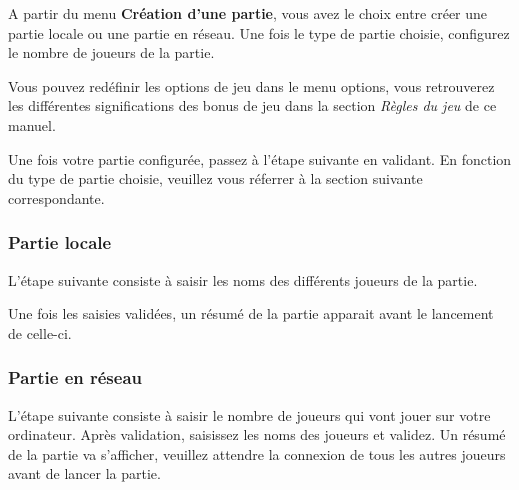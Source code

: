 	A partir du menu \textbf{Création d'une partie}, vous avez le choix entre créer une partie locale ou une partie en réseau.
Une fois le type de partie choisie, configurez le nombre de joueurs de la partie. 


Vous pouvez redéfinir les options de jeu dans le menu options, vous retrouverez les différentes significations des bonus de jeu dans la section \textit{Règles du jeu} de ce manuel.


Une fois votre partie configurée, passez à l'étape suivante en validant. En fonction du type de partie choisie, veuillez vous réferrer à la section suivante correspondante.

	\subsubsection{Partie locale}
		L'étape suivante consiste à saisir les noms des différents joueurs de la partie. 
		
		Une fois les saisies validées, un résumé de la partie apparait avant le lancement de celle-ci.
		
	\subsubsection{Partie en réseau}
		L'étape suivante consiste à saisir le nombre de joueurs qui vont jouer sur votre ordinateur.
		Après validation, saisissez les noms des joueurs et validez.
		Un résumé de la partie va s'afficher, veuillez attendre la connexion de tous les autres joueurs avant de lancer la partie.
		
